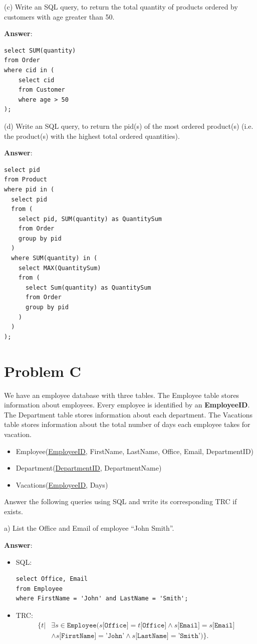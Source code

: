 \documentclass{article}
\begin{document}
(c) Write an SQL query, to return the total quantity of products ordered by customers with age greater than 50.

{\bf Answer}:
\begin{verbatim}
select SUM(quantity)
from Order
where cid in (
    select cid
    from Customer
    where age > 50
);
\end{verbatim}

(d) Write an SQL query, to return the pid(s) of the most ordered product(s) (i.e. the product(s) with the highest total ordered quantities).

{\bf Answer}: 
\begin{verbatim}
select pid
from Product
where pid in (
  select pid
  from (
    select pid, SUM(quantity) as QuantitySum
    from Order
    group by pid
  )
  where SUM(quantity) in (
    select MAX(QuantitySum)
    from (
      select Sum(quantity) as QuantitySum
      from Order
      group by pid
    )
  )
);
\end{verbatim}

\section{Problem C}
We have an employee database with three tables. The Employee table stores information about employees. Every employee is identified by an {\bf EmployeeID}. The Department table stores information about each department. The Vacations table stores information about the total number of days each employee takes for vacation.
\begin{itemize}
\item Employee(\underline{EmployeeID}, FirstName, LastName, Office, Email, DepartmentID)
\item Department(\underline{DepartmentID}, DepartmentName)
\item Vacations(\underline{EmployeeID}, Days)
\end{itemize}

Answer the following queries using SQL and write its corresponding TRC if exists.

a) List the Office and Email of employee ``John Smith''.

{\bf Answer}: 
\begin{itemize}
\item SQL:
\begin{verbatim}
select Office, Email
from Employee
where FirstName = 'John' and LastName = 'Smith';
\end{verbatim}

\item TRC:
$$\begin{aligned}
\{t | &\exists s \in \texttt{Employee} (s\texttt{[Office]} = t\texttt{[Office]} \wedge s\texttt{[Email]} = s\texttt{[Email]} \\
&\wedge s\texttt{[FirstName]} = \texttt{'John'} \wedge s\texttt{[LastName]} = \texttt{'Smith'})\}.
\end{aligned}$$
\end{itemize}
\end{document}
